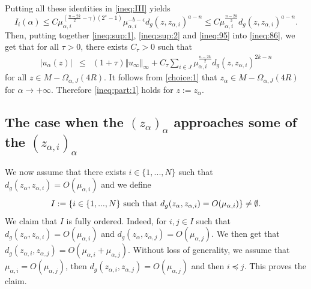 \documentclass[reqno]{amsart}
\def \eps {\epsilon}
\def \crit {2^\star}
\def \ua {u_\alpha}
\def \za {z_\alpha}
\def \mai {\mu_{\alpha,i}}
\def \maj {\mu_{\alpha,j}}
\def \zai {z_{\alpha,i}}
\def \zaj {z_{\alpha,j}}
\begin{document}
Putting all these identities in \eqref{ineq:III} yields
\begin{equation}\label{ineq:95}
I_i(\alpha)\leq C \mai^{ (\frac{n-2k}{2}-\gamma )(\crit-1)}\mai^{-b-\eps} d_g(z,\zai)^{a-n}\leq C \mai^{ \frac{n-2k}{2}}d_g(z,\zai)^{a-n}.
\end{equation}
Then, putting together \eqref{ineq:sup:1}, \eqref{ineq:sup:2} and \eqref{ineq:95} into \eqref{ineq:86}, we get that for all $\tau>0$, there exists $C_\tau>0$ such that
\begin{eqnarray}\label{ineq:part:1}
|\ua(z)|&\leq& (1+\tau)\Vert u_\infty\Vert_\infty+C_\tau\sum_{i\in J} \mai^{\frac{n-2k}{2}}d_g(z,\zai)^{2k-n} 
\end{eqnarray}
 for all $ z\in M-\Omega_{\alpha,J}(4R)$. It follows from \eqref{choice:1} that $\za\in M-\Omega_{\alpha,J}(4R)$ for $\alpha\to +\infty$. Therefore \eqref{ineq:part:1} holds for $z:=z_\alpha$. 
\subsection{The case when the $(\za)_\alpha$ approaches some of the $(\zai)_\alpha$}
We now assume that there exists $i\in\{1,...,N\}$ such that $d_g(\za,\zai)=O(\mai)$ and we define
\begin{equation}\label{choice:2}
I:=\{i\in\{1,...,N\}\hbox{ such that }d_g(\za,\zai)=O(\mai)\}\neq \emptyset.
\end{equation}
We claim that $I$ is fully ordered. Indeed, for $i,j\in I$ such that $d_g(\za,\zai)=O(\mai)$ and $d_g(\za,\zaj)=O(\maj)$. We then get that $d_g(\zai,\zaj)=O(\mai+\maj)$. Without loss of generality, we assume that $\mai=O(\maj)$, then $d_g(\zai,\zaj)=O( \maj)$ and then $i\preceq j$. This proves the claim.
\end{document}
